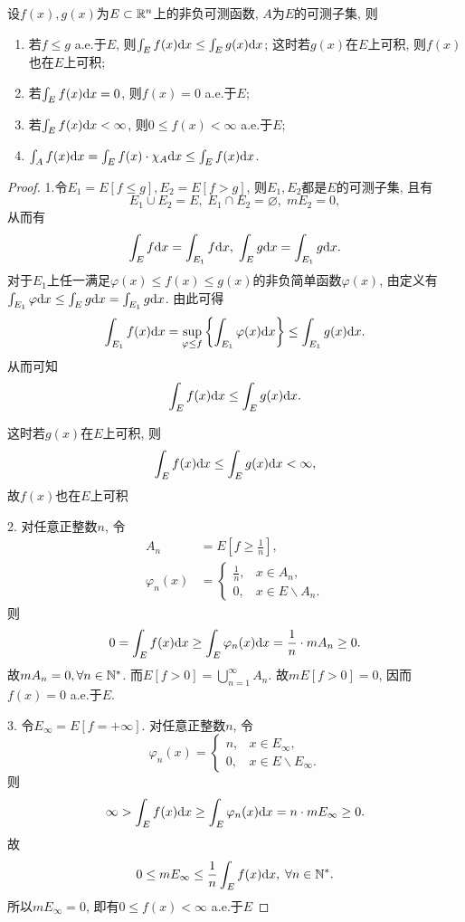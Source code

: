 \vskip 0.2cm
\begin{theorem}
	设$f(x),g(x)$为$E \subset \mathbb{R}^n$上的非负可测函数, $A$为$E$的可测子集, 则
	\begin{enumerate}
		\item 若$f \leq g$ a.e.于$E$, 则$\int_E f(x) \mathrm{d} x \leq \int_E g(x) \mathrm{d} x$; 这时若$g(x)$在$E$上可积, 则$f(x)$也在$E$上可积; 
		\item 若$\int_E f(x) \mathrm{d} x = 0$, 则$f(x) = 0$ a.e.于$E$;
		\item 若$\int_E f(x) \mathrm{d} x < \infty$, 则$0 \leq f(x) < \infty$ a.e.于$E$;
		\item $\int_A f(x) \mathrm{d} x = \int_E f(x) \cdot \chi_A \mathrm{d} x \leq \int_E f(x) \mathrm{d} x$. 
	\end{enumerate}
\end{theorem}
\begin{proof}\par 
	1.令$E_1 = E[f \leq g], E_2 = E[f > g]$, 则$E_1, E_2$都是$E$的可测子集, 且有
	$$
		E_1 \cup E_2 = E, \;
		E_1 \cap E_2 = \varnothing, \;
		m E_2 = 0 , 
	$$
	从而有
	$$
		\int_E f \mathrm{d} x = \int_{E_1} f \mathrm{d} x ,\;
		\int_E g \mathrm{d} x = \int_{E_1} g \mathrm{d} x .
	$$
	对于$E_1$上任一满足$\varphi(x) \leq f(x) \leq g(x)$的非负简单函数$\varphi(x)$,
	由定义有$\int_{E_1} \varphi \mathrm{d} x \leq \int_E g \mathrm{d} x = \int_{E_1} g \mathrm{d} x$.
	由此可得
	$$
		\int_{E_1} f(x) \mathrm{d} x = \sup\limits_{\varphi \leq f } 
		\left\{ \int_{E_1} \varphi(x) \mathrm{d} x \right\}
		\leq \int_{E_1} g(x) \mathrm{d} x .
	$$
	从而可知
	$$
		\int_E f(x) \mathrm{d} x \leq \int_E g(x) \mathrm{d} x.
	$$
	
	这时若$g(x)$在$E$上可积, 则
	$$
		\int_E f(x) \mathrm{d} x \leq \int_E g(x) \mathrm{d} x < \infty, 
	$$
	故$f(x)$也在$E$上可积
	\par  
	2. \;
	对任意正整数$n$, 令
	$$
		\begin{aligned}
			A_n &= E\left[ f \geq \frac{1}{n} \right] ,\\
			\varphi_n(x) &= 
			\begin{cases}
				\frac 1n, & x \in A_n, \\
				0, & x \in E \backslash A_n.
			\end{cases}
		\end{aligned}
	$$
	则
	$$
		0 = \int_E f(x) \mathrm{d} x \geq \int_E \varphi_n(x) \mathrm{d} x = \frac 1n \cdot m A_n \geq 0.
	$$
	故$m A_n = 0, \forall n \in \mathbb{N}^*$. 
	而$E[f>0] = \bigcup\limits_{n=1}^{\infty} A_n$. 
	故$m E[f>0] = 0$, 因而$f(x) = 0$ a.e.于$E$.
	\par 
	3. \;
	令$E_{\infty} = E[f = +\infty]$. 
	对任意正整数$n$, 令
	$$
		\varphi_n(x) = 
		\begin{cases}
			n, & x\in E_{\infty}, \\
			0, & x\in E \backslash E_{\infty}.
		\end{cases}
	$$
	则
	$$
		\infty > \int_E f(x) \mathrm{d} x \geq \int_E \varphi_n(x) \mathrm{d} x = n \cdot m E_{\infty} \geq 0.
	$$
	故
	$$
		0 \leq m E_{\infty} \leq \frac 1n \int_E f(x) \mathrm{d} x, \; \forall n \in \mathbb{N}^*.
	$$
	所以$m E_{\infty} = 0$, 即有$0 \leq f(x) < \infty$ a.e.于$E$
\end{proof}

